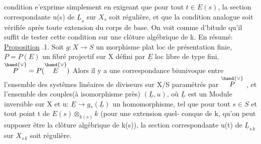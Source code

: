 
condition e'exprime simplement en exigeant que pour tout $t\in E(s)$,
la section correspondante u(s) de $\underline{L}_s$ sur $X_s$ soit régulière, et que la
condition analogue soit vérifiée après toute extension du corps de base.
On voit comme d'bitude qu'il suffit de tester cette condition sur une
clôture algébrique de k. En résumé:
\uline{Proposition} .1. Soit $g:X\to S$ un morphisme plat loc de présentation
finie, $P=P(E)$ un fibré projectif sur X défini par $\underline{E}$ loc libre de type
fini, $\overset{\hand{\vee}}{P} = P(\overset{\hand{\vee}}{E})$ \hand{,} Alors il y a une correspondance biunivoque entre
l'ensemble des systêmes linéaires de diviseurs sur X/S paramétrés par $\overset{\hand{\vee}}{P}$ ,
et l'ensemble des couples(à isomorphisme près) $(\underline{L},u)$, où $\underline{L}$ est un
Module inversible sur X et u: $\underline{E}\to g_*(\underline{L})$ un homomorphisme, tel que
pour tout $s\in S$ et tout point t de $E(s)\otimes_{k(s)}k$ (pour une extension quel-%
 conque de k, qu'on peut supposer être la clôture algébrique de k(s)),
la section correspondante u(t) de $\underline{L}_{s\,k}$ sur $X_{s\,k}$ soit régulière.


